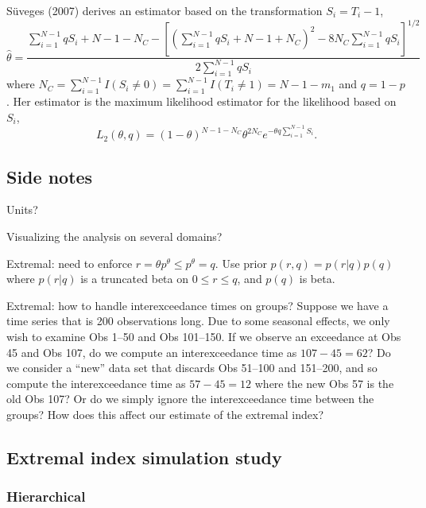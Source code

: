 \documentclass[12pt]{article}
\begin{document}
S{\"u}veges (2007) derives an estimator based on the transformation $S_i=T_i-1$,
\[ \hat{\theta} = \frac{ \sum_{i=1}^{N-1}qS_i +N-1-N_C-\left[\left(\sum_{i=1}^{N-1}qS_i+N-1+N_C\right)^2-8N_C\sum_{i=1}^{N-1}qS_i\right]^{1/2}}{2\sum_{i=1}^{N-1}qS_i} \]
where $N_C=\sum_{i=1}^{N-1}I(S_i\neq 0)=\sum_{i=1}^{N-1}I(T_i \neq 1)=N-1-m_1$ and $q=1-p$. Her estimator is the maximum likelihood estimator for the likelihood based on $S_i$,
\[ L_2(\theta, q)= (1-\theta)^{N-1-N_C}\theta^{2N_C}e^{-\theta q \sum_{i=1}^{N-1}S_i}. \]
\bigskip





\subsection*{Side notes}

Units?
\bigskip

Visualizing the analysis on several domains?
\bigskip

Extremal: need to enforce $r = \theta p^\theta \leq p^\theta = q$. Use prior $p(r,q)=p(r|q)p(q)$ where $p(r|q)$ is a truncated beta on $0\leq r \leq q$, and $p(q)$ is beta.
\bigskip

Extremal: how to handle interexceedance times on groups? Suppose we have a time series that is 200 observations long. Due to some seasonal effects, we only wish to examine Obs 1--50 and Obs 101--150. If we observe an exceedance at Obs 45 and Obs 107, do we compute an interexceedance time as $107-45=62$? Do we consider a ``new'' data set that discards Obs 51--100 and 151--200, and so compute the interexceedance time as $57-45=12$ where the new Obs 57 is the old Obs 107? Or do we simply ignore the interexceedance time between the groups? How does this affect our estimate of the extremal index?


\subsection*{Extremal index simulation study}

\subsubsection*{Hierarchical}

\newpage
\end{document}
